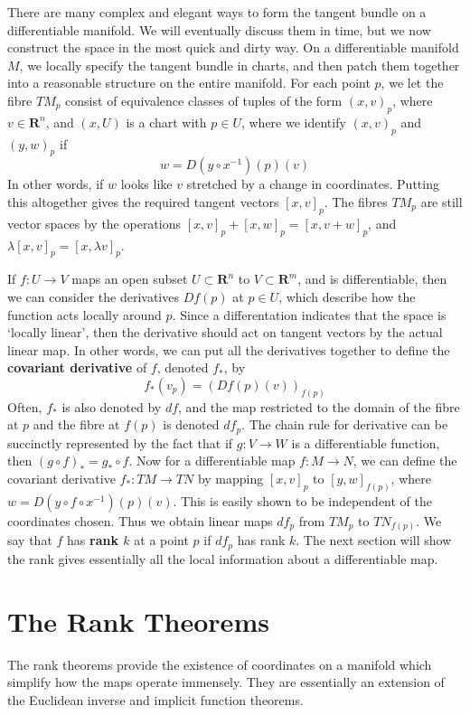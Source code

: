 There are many complex and elegant ways to form the tangent bundle on a differentiable manifold. We will eventually discuss them in time, but we now construct the space in the most quick and dirty way. On a differentiable manifold $M$, we locally specify the tangent bundle in charts, and then patch them together into a reasonable structure on the entire manifold. For each point $p$, we let the fibre $TM_p$ consist of equivalence classes of tuples of the form $(x,v)_p$, where $v \in \mathbf{R}^n$, and $(x,U)$ is a chart with $p \in U$, where we identify $(x,v)_p$ and $(y,w)_p$ if
%
\[ w = D(y \circ x^{-1})(p)(v) \]
%
In other words, if $w$ looks like $v$ stretched by a change in coordinates. Putting this altogether gives the required tangent vectors $[x,v]_p$. The fibres $TM_p$ are still vector spaces by the operations $[x,v]_p + [x,w]_p = [x,v+w]_p$, and $\lambda [x,v]_p = [x,\lambda v]_p$.

If $f: U \to V$ maps an open subset $U \subset \mathbf{R}^n$ to $V \subset \mathbf{R}^m$, and is differentiable, then we can consider the derivatives $Df(p)$ at $p \in U$, which describe how the function acts locally around $p$. Since a differentation indicates that the space is `locally linear', then the derivative should act on tangent vectors by the actual linear map. In other words, we can put all the derivatives together to define the {\bf covariant derivative} of $f$, denoted $f_*$, by
%
\[ f_*(v_p) = (Df(p)(v))_{f(p)} \]
%
Often, $f_*$ is also denoted by $df$, and the map restricted to the domain of the fibre at $p$ and the fibre at $f(p)$ is denoted $df_p$. The chain rule for derivative can be succinctly represented by the fact that if $g: V \to W$ is a differentiable function, then $(g \circ f)_* = g_* \circ f$. Now for a differentiable map $f: M \to N$, we can define the covariant derivative $f_*: TM \to TN$ by mapping $[x,v]_p$ to $[y,w]_{f(p)}$, where $w = D(y \circ f \circ x^{-1})(p)(v)$. This is easily shown to be independent of the coordinates chosen. Thus we obtain linear maps $df_p$ from $TM_p$ to $TN_{f(p)}$. We say that $f$ has {\bf rank $k$} at a point $p$ if $df_p$ has rank $k$. The next section will show the rank gives essentially all the local information about a differentiable map.

\section{The Rank Theorems}

The rank theorems provide the existence of coordinates on a manifold which simplify how the maps operate immensely. They are essentially an extension of the Euclidean inverse and implicit function theorems.

